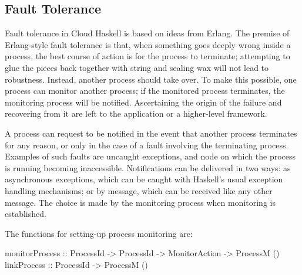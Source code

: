 \documentclass[preprint]{sigplanconf}
\begin{document}


\subsection{Fault Tolerance}
\label{FaultTolerance}
Fault tolerance in Cloud Haskell is based on ideas from Erlang. 
%
The premise of Erlang-style fault tolerance is that, when something goes deeply wrong inside a process, the best course of action is for the process to terminate; attempting to glue the pieces back together with string and sealing wax will not lead to robustness.   Instead, another process should take over.  
To make this possible, one process can monitor another process; if the monitored process terminates, the monitoring process will be notified. 
Ascertaining the origin of the failure and recovering from it are left to the application or a higher-level framework.

A process can request to be notified in the event that another process terminates for any reason, or only in the case of a fault involving the terminating process.
Examples of such faults are uncaught exceptions, and node on which the process is running becoming inaccessible. 
Notifications can be delivered in two ways: as asynchronous exceptions, which can be caught with Haskell's usual exception handling mechanisms; or by message, which can be received like any other message.
The choice is made by the monitoring process when monitoring is established.

The functions for setting-up process monitoring are:

\begin{code}
monitorProcess :: ProcessId -> ProcessId
               		-> MonitorAction -> ProcessM ()
linkProcess    :: ProcessId -> ProcessM ()
\end{code}
\end{document}
